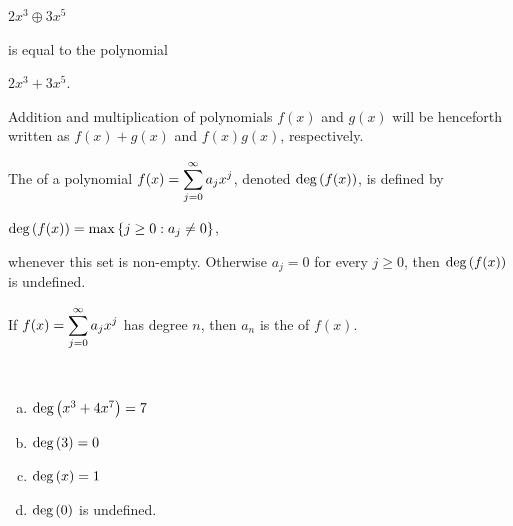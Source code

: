 \documentclass[11pt,fleqn,dvipsnames,usenames]{article}
\newcommand{\p}{\noindent}
\begin{document}
\begin{center}
$2x^3 \oplus 3x^5$
\end{center}

\p is equal to the polynomial

\begin{center}
$2x^3 + 3x^5$.
\end{center}

\p Addition and multiplication of polynomials $f(x)$ and $g(x)$ will be henceforth written as $f(x) + g(x)$ and $f(x)g(x)$, respectively.

%
\begin{definition} The  of a polynomial $f(x) = \displaystyle\sum\limits_{j=0}^{\infty}a_{j}x^{j}$, denoted $\text{deg}\left(f(x)\right)$, is defined by
\begin{center}
 $\text{deg}\left(f(x)\right) = \max \left\{j\geq 0:a_{j} \neq 0\right\}$,
 \end{center}
whenever this set is non-empty.  Otherwise $a_{j} = 0$ for every $j\geq 0$, then $\text{deg}\left(f(x)\right)$ is undefined.
\end{definition}

\terminology If $f(x) = \displaystyle\sum\limits_{j=0}^{\infty}a_{j}x^{j}$ has degree $n$, then $a_{n}$ is the  of $f(x)$.
\vsp

\begin{examples}~
\begin{multicols}{2}
\begin{enumerate}[(a)]
\item $\text{deg}\left(x^3 + 4x^7\right) = 7$
\item $\text{deg}\left(3\right) = 0$
\item $\text{deg}\left(x\right) = 1$
\item $\text{deg}\left(0\right)$ is undefined.
\end{enumerate}
\end{multicols}
\end{examples}
\end{document}

